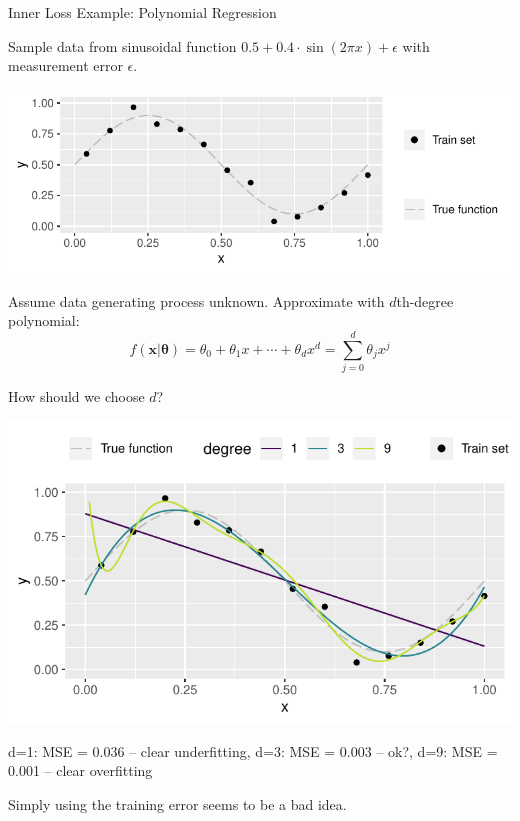     \begin{frame}[c,allowframebreaks]{Inner Loss Example: Polynomial Regression}

    Sample data from sinusoidal function
    $0.5 + 0.4 \cdot \sin (2 \pi x) + \epsilon$
    with measurement error $\epsilon$.

    \begin{center}
    \includegraphics[width=.7\textwidth]{poly}
    \end{center}

    Assume data generating process unknown. Approximate with $d$th-degree polynomial:
    \[ f(\mathbf{x} | \mathbf{\theta}) = \theta_0 + \theta_1 x + \cdots + \theta_d x^d = \sum_{j = 0}^{d} \theta_j x^j \]

    \framebreak

    How should we choose $d$?

    \begin{center}
    \includegraphics[width=.5\textwidth]{poly-train}
    \end{center}

    d=1: MSE = 0.036 -- clear underfitting, d=3: MSE = 0.003 -- ok?, d=9: MSE =
    0.001 -- clear overfitting

    Simply using the training error seems to be a bad idea.

    \end{frame}

